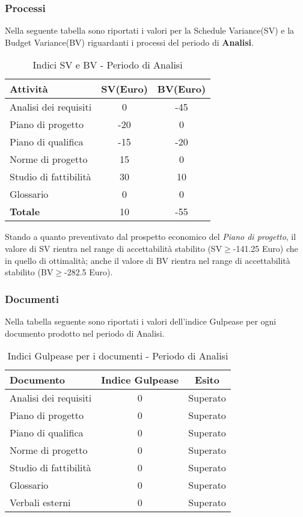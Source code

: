       \subsubsection{Processi}
      Nella seguente tabella sono riportati i valori per la Schedule Variance(SV) e la Budget Variance(BV) riguardanti i processi del periodo di \textbf{Analisi}.\\
      \begin{table}[H]
        \centering
        \begin{tabular}{|l|c|c|}
          \hline
          \textbf{Attività} &\textbf{SV}(Euro)  &\textbf{BV}(Euro) \\
          \hline
          Analisi dei requisiti  &0 &-45  \\
          Piano di progetto &-20  &0\\
          Piano di qualifica  &-15  &-20\\
          Norme di progetto &15  &0 \\
          Studio di fattibilità &30  &10  \\
          Glossario &0  &0  \\
          \hline
          \textbf{Totale} &10  &-55  \\
          \hline
        \end{tabular}
        \caption{Indici SV e BV - Periodo di Analisi}
      \end{table}
      Stando a quanto preventivato dal prospetto economico del \emph{Piano di progetto}, il valore di SV rientra nel range di accettabilità stabilito (SV\(\geq\)-141.25 Euro) che in quello di ottimalità;
      anche il valore di BV rientra nel range di accettabilità stabilito (BV\(\geq\)-282.5 Euro).
      \subsubsection{Documenti}
      Nella tabella seguente sono riportati i valori dell'indice Gulpease per ogni documento prodotto nel periodo di Analisi.\\
      \begin{table}[H]
        \centering
        \begin{tabular}{|l|c|c|}
          \hline
          \textbf{Documento} &\textbf{Indice Gulpease} &\textbf{Esito}\\
          \hline
          Analisi dei requisiti &0  &Superato \\
          Piano di progetto &0  &Superato \\
          Piano di qualifica  &0  &Superato \\
          Norme di progetto &0  &Superato \\
          Studio di fattibilità &0  &Superato \\
          Glossario &0  &Superato  \\
          Verbali esterni &0  &Superato \\
          \hline
        \end{tabular}
        \caption{Indici Gulpease per i documenti - Periodo di Analisi}
      \end{table}
